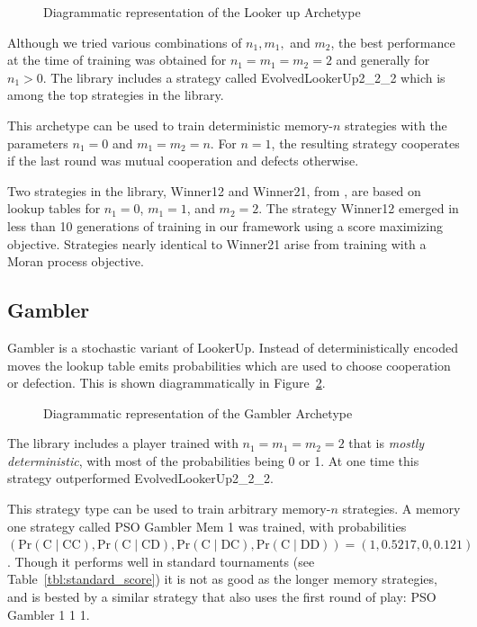 \documentclass{article}
\begin{document}
\begin{figure}[!hbtp]
    \centering
    
    \caption{Diagrammatic representation of the Looker up Archetype}
    \label{fig:lookerup}
\end{figure}

Although we tried various
combinations of $n_1, m_1,$ and $m_2$, the best performance at the time of
training was obtained for $n_1 = m_1 = m_2 = 2$ and generally for $n_1 > 0$.
The library includes a strategy
called EvolvedLookerUp2\_2\_2 which is among the top strategies in the library.

This archetype can be used to train deterministic memory-$n$ strategies with the
parameters $n_1=0$ and $m_1=m_2=n$. For $n=1$, the resulting strategy cooperates
if the last round was mutual cooperation and defects otherwise.

Two strategies in the library, Winner12 and Winner21, from \cite{Mathieu2015},
are based on lookup tables for $n_1 = 0$, $m_1 = 1$, and $m_2=2$. The strategy
Winner12 emerged in less than 10 generations of training in our framework using
a score maximizing objective. Strategies nearly identical to Winner21 arise
from training with a Moran process objective.

\subsection{Gambler}

Gambler is a stochastic variant of LookerUp. Instead of deterministically
encoded moves the lookup table emits probabilities which are
used to choose cooperation or defection.
This is shown diagrammatically in Figure~\ref{fig:gambler}.

\begin{figure}[!hbtp]
    \centering
    
    \caption{Diagrammatic representation of the Gambler Archetype}
    \label{fig:gambler}
\end{figure}

The library includes a player trained
with $n_1 = m_1 = m_2 = 2$ that is \emph{mostly deterministic}, with most of the
probabilities being 0 or 1. At one time this strategy outperformed
EvolvedLookerUp2\_2\_2.

This strategy type can be used to train arbitrary memory-$n$ strategies. A
memory one strategy called PSO Gambler Mem 1 was trained, with
probabilities $(\text{Pr}(\text{C}\;|\;\text{CC}),
                \text{Pr}(\text{C}\;|\;\text{CD}),
                \text{Pr}(\text{C}\;|\;\text{DC}),
                \text{Pr}(\text{C}\;|\;\text{DD})) = (1, 0.5217, 0, 0.121)$.
Though it performs well in standard tournaments (see
Table~\ref{tbl:standard_score})
it is not as good as the longer memory strategies, and is bested by a similar
strategy that also uses the first round of play: PSO Gambler 1 1 1.
\end{document}
